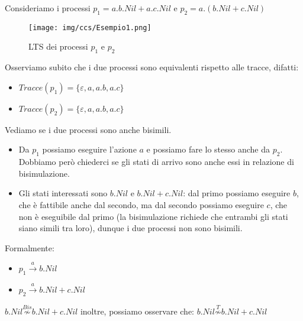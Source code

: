 \begin{esempio}
    Consideriamo i processi $p_1 = a . b . Nil + a . c . Nil$ e
    $p_2 = a . (b . Nil + c . Nil)$
    \begin{figure}[!ht]
        \centering
        \texttt{[image: img/ccs/Esempio1.png]}
        \caption{LTS dei processi $p_1$ e $p_2$}
    \end{figure}
    Osserviamo subito che i due processi sono equivalenti rispetto alle tracce,
    difatti:
    \begin{itemize}
        \item $Tracce(p_1) = \{\varepsilon, a, a . b, a . c\}$
        \item $Tracce(p_2) = \{\varepsilon, a, a . b, a . c\}$
    \end{itemize}
    Vediamo se i due processi sono anche bisimili.
    \begin{itemize}
        \item Da $p_1$ possiamo eseguire l'azione $a$ e possiamo fare lo stesso
              anche da $p_2$. Dobbiamo però chiederci se gli stati di arrivo sono anche
              essi in relazione di bisimulazione.
        \item Gli stati interessati sono $b . Nil$ e $b . Nil + c . Nil$:
              dal primo possiamo eseguire $b$, che è fattibile anche dal secondo, ma
              dal secondo possiamo eseguire $c$, che non è eseguibile dal primo (la
              bisimulazione richiede che entrambi gli stati siano simili tra loro),
              dunque i due processi non sono bisimili.
    \end{itemize}
    Formalmente:
    \begin{itemize}
        \item $p_1 \xrightarrow{a} b . Nil$
        \item $p_2 \xrightarrow{a} b . Nil + c . Nil$
    \end{itemize}
    $b . Nil \stackrel{Bis}{\not\sim} b . Nil + c . Nil$ inoltre,
    possiamo osservare che: $b . Nil \stackrel{T}{\not\sim} b . Nil + c . Nil$
\end{esempio}
